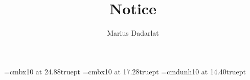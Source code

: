 \addtolength{\oddsidemargin}{-6em}                               %
\addtolength{\textwidth}{12em}                                   %
\addtolength{\topmargin}{-17ex}                                   %
\addtolength{\textheight}{32ex}
\font\TitleFont=cmbx10 at 24.88truept
\font\DateFont=cmbx10 at 17.28truept
\font\SubTitleFont=cmdunh10 at 14.40truept
\newcommand{\st}{^{\textstyle{\ast}}}
\newcommand{\iinfo}[2]{{\raggedright{\em#1}}\\ &{\raggedright{\hspace*{.2truein}#2}}\\[1ex]}
\newcommand{\cinfo}[2]{{\raggedright{\hspace*{.2truein}\em#1}}\\ &{\raggedright{\hspace*{.2truein}\hspace*{.2truein}#2}}\\[1ex]}
\newcommand{\CONT}{{\raggedright{\bf Session for contributed papers}}\\}
\newcommand{\rmB}{\ \ \ \ Room: 252&}
\newcommand{\rmA}{\ \ \ \ Room: 274&}
\newcommand{\rmC}{\ \ \ \ Room: 274&}
\newcommand{\rmD}{\ \ \ \ Room: TBA&}
\pagestyle{empty}                                               %
\title{Notice}                                               %
\author{Marius Dadarlat}                                          %

